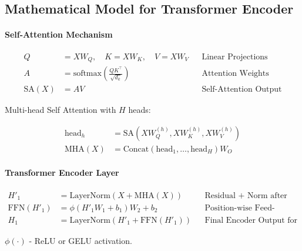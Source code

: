 \FloatBarrier
\subsection{Mathematical Model for Transformer Encoder}

\paragraph{Self-Attention Mechanism}

\begin{align*}
    Q &= X W_Q, \quad K = X W_K, \quad V = X W_V && \text{Linear Projections} \\
    A &= \text{softmax}\left(\frac{Q K^\top}{\sqrt{d_k}}\right) && \text{Attention Weights} \\
    \text{SA}(X) &= A V && \text{Self-Attention Output}
\end{align*}

Multi-head Self Attention with $H$ heads:

\begin{align*}
    \text{head}_h &= \text{SA}(X W_Q^{(h)}, X W_K^{(h)}, X W_V^{(h)}) \\
    \text{MHA}(X) &= \text{Concat}(\text{head}_1, \dots, \text{head}_H) W_O
\end{align*}

\paragraph{Transformer Encoder Layer}

\begin{align*}
    H'_1 &= \text{LayerNorm}\left(X + \text{MHA}(X)\right) && \text{Residual + Norm after MHA} \\
    \text{FFN}(H'_1) &= \phi(H'_1 W_1 + b_1) W_2 + b_2 && \text{Position-wise Feed-Forward} \\
    H_1 &= \text{LayerNorm}\left(H'_1 + \text{FFN}(H'_1)\right) && \text{Final Encoder Output for Layer}
\end{align*}

$\phi(\cdot)$ - ReLU or GELU activation.

